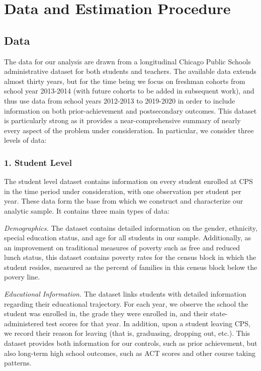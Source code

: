 \documentclass[../thesis_main.tex]{subfiles}
\begin{document}
\doublespacing
\section{Data and Estimation Procedure}
\label{section:data}

\subsection{Data}

The data for our analysis are drawn from a longitudinal Chicago Public Schools administrative dataset for both students and teachers. The available data extends almost thirty years, but for the time being we focus on freshman cohorts from school year 2013-2014 (with future cohorts to be added in subsequent work), and thus use data from school years 2012-2013 to 2019-2020 in order to include information on both prior-achievement and postsecondary outcomes. This dataset is particularly strong as it provides a near-comprehensive summary of nearly every aspect of the problem under consideration. In particular, we consider three levels of data:

\subsubsection{1. Student Level} 

The student level dataset contains information on every student enrolled at CPS in the time period under consideration, with one observation per student per year. These data form the base from which we construct and characterize our analytic sample. It contains three main types of data:

\textit{Demographics.} The dataset contains detailed information on the gender, ethnicity, special education status, and age for all students in our sample. Additionally, as an improvement on traditional measures of poverty such as free and reduced lunch status, this dataset contains poverty rates for the census block in which the student resides, measured as the percent of families in this census block below the povery line.

\textit{Educational Information.} The dataset links students with detailed information regarding their educational trajectory. For each year, we observe the school the student was enrolled in, the grade they were enrolled in, and their state-administered test scores for that year. In addition, upon a student leaving CPS, we record their reason for leaving (that is, graduasing, dropping out, etc.). This dataset provides both information for our controls, such as prior achievement, but also long-term high school outcomes, such as ACT scores and other course taking patterns. 
\end{document}
